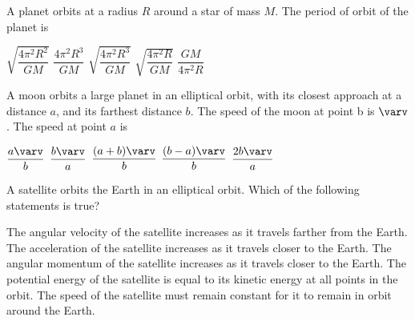 \documentclass{../../oss-classkick-exam}
\begin{document}
\begin{multicols*}{2}
\begin{questions}
    \question A planet orbits at a radius $R$ around a star of mass $M$. The
    period of orbit of the planet is
    \begin{choices}
      \choice $\sqrt{\dfrac{4\pi^2R^2}{GM}}$
      \choice $\dfrac{4\pi^2R^3}{GM}$
      \choice $\sqrt{\dfrac{4\pi^2R^3}{GM}}$
      \choice $\sqrt{\dfrac{4\pi^2R}{GM}}$
      \choice $\dfrac{GM}{4\pi^2R}$
    \end{choices}

    \question A moon orbits a large planet in an elliptical orbit, with its
    closest approach at a distance $a$, and its farthest distance $b$. The
    speed of the moon at point b is $\varv$. The speed at point $a$ is
    \begin{choices}
      \choice $\dfrac{a\varv}b$
      \choice $\dfrac{b\varv}a$
      \choice $\dfrac{(a+b)\varv}b$
      \choice $\dfrac{(b-a)\varv}b$
      \choice $\dfrac{2b\varv}a$
    \end{choices}

    \question A satellite orbits the Earth in an elliptical orbit. Which of the
    following statements is true?
    \begin{choices}
      \choice The angular velocity of the satellite increases as it travels
      farther from the Earth.
      \choice The acceleration of the satellite increases as it travels closer
      to the Earth.
      \choice The angular momentum of the satellite increases as it travels
      closer to the Earth.
      \choice The potential energy of the satellite is equal to its kinetic
      energy at all points in the orbit.
      \choice The speed of the satellite must remain constant for it to remain
      in orbit around the Earth.
    \end{choices}
    \vspace{.7in}
    \columnbreak

    

\end{questions}
\end{multicols*}
\end{document}
